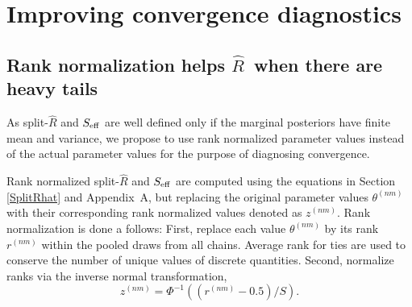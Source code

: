 \documentclass[american,]{article}
\let\rmarkdownfootnote\footnote%
\def\footnote{\protect\rmarkdownfootnote}
\newcommand{\Rhat}{$\widehat{R}$}
\theoremstyle{definition}
\begin{document}
%
%


\hypertarget{improving-convergence-diagnostics}{%
\section{Improving convergence
diagnostics}\label{improving-convergence-diagnostics}}

\hypertarget{rank-normalization}{%
\subsection{Rank normalization helps  \Rhat\ when there are heavy tails}\label{rank-normalization}}

As split-\(\widehat{R}\) and \(S_{\rm eff}\) are well defined
only if the marginal posteriors have finite mean and variance, we
propose to use rank normalized parameter values instead of the actual
parameter values for the purpose of diagnosing convergence.

Rank normalized split-\(\widehat{R}\) and \(S_{\rm eff}\) are
computed using the equations in Section \ref{SplitRhat} and Appendix~A, but
replacing the original parameter values \(\theta^{(nm)}\) with their
corresponding rank normalized values denoted as \(z^{(nm)}\). Rank
normalization is done a follows: First, replace each value
\(\theta^{(nm)}\) by its rank \(r^{(nm)}\) within the pooled draws from all chains.
 Average rank for ties are
used to conserve the number of unique values of discrete quantities.
 Second, normalize ranks via the inverse normal transformation,
\begin{equation}
z^{(nm)} = \Phi^{-1}((r^{(nm)}-0.5)/S).
\end{equation}
\end{document}

